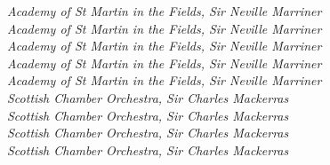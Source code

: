 \bigskip
{} \textit{Academy of St Martin in the Fields, Sir Neville Marriner}\marginnote{} \\
 \textit{Academy of St Martin in the Fields, Sir Neville Marriner}\marginnote{} \\
 \textit{Academy of St Martin in the Fields, Sir Neville Marriner}\marginnote{} \\
 \textit{Academy of St Martin in the Fields, Sir Neville Marriner}\marginnote{} \\
 \textit{Academy of St Martin in the Fields, Sir Neville Marriner}\marginnote{} \\
 \textit{Scottish Chamber Orchestra, Sir Charles Mackerras} \\
 \textit{Scottish Chamber Orchestra, Sir Charles Mackerras} \\
 \textit{Scottish Chamber Orchestra, Sir Charles Mackerras} \\
 \textit{Scottish Chamber Orchestra, Sir Charles Mackerras} \\

\bigskip

 \\

